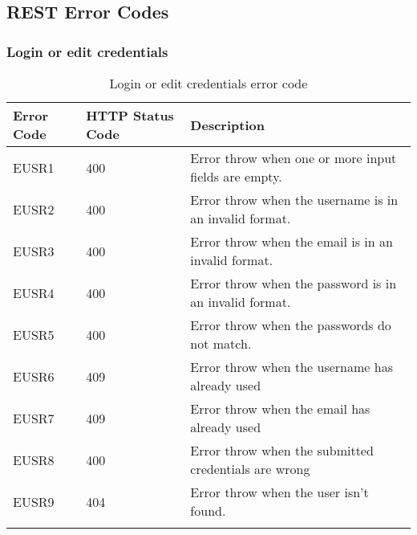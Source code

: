 \subsection{REST Error Codes}


\subsubsection{Login or edit credentials}
\begin{longtable}{|p{}|p{} |p{}|} 
    \hline
    \textbf{Error Code} & \textbf{HTTP Status Code} & \textbf{Description} \\\hline
    EUSR1 & 400 & Error throw when one or more input fields are empty.\\\hline
    EUSR2 & 400 & Error throw when the username is in an invalid format.\\\hline
    EUSR3 & 400 & Error throw when the email is in an invalid format.\\\hline
    EUSR4 & 400 & Error throw when the password is in an invalid format.\\\hline
    EUSR5 & 400 & Error throw when the passwords do not match.\\\hline
    EUSR6 & 409 & Error throw when the username has already used\\\hline
    EUSR7 & 409 & Error throw when the email has already used\\\hline
    EUSR8 & 400 & Error throw when the submitted credentials are wrong\\\hline
    EUSR9 & 404 & Error throw when the user isn't found.\\\hline
    \caption{Login or edit credentials error code}
    \label{tab:Login_or_edit_credentials_error_code}
\end{longtable}
